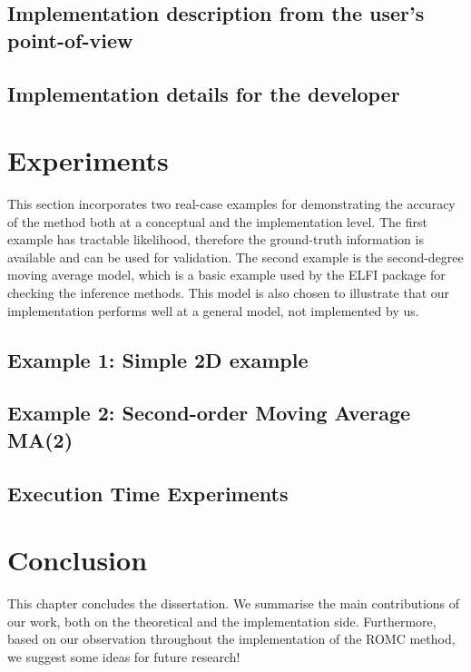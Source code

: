 \documentclass[11pt,twoside]{article}
\numberwithin{Theorem}{section}
\numberwithin{Definition}{section}
\numberwithin{Lemma}{section}
\numberwithin{Algorithm}{section}
\numberwithin{equation}{section}
\begin{document}
\subsection{Implementation description from the user's point-of-view}
\label{subsec:user}


\subsection{Implementation details for the developer}
\label{subsec:developers}

\clearpage


\section{Experiments}
This section incorporates two real-case examples for demonstrating the
accuracy of the method both at a conceptual and the implementation
level. The first example has tractable likelihood, therefore the
ground-truth information is available and can be used for
validation. The second example is the second-degree moving average
model, which is a basic example used by the ELFI package for checking
the inference methods. This model is also chosen to illustrate that
our implementation performs well at a general model, not implemented
by us.

\subsection{Example 1: Simple 2D example}
\label{subsec:ex1}


\subsection{Example 2: Second-order Moving Average MA(2)}
\label{subsec:ma2}


\subsection{Execution Time Experiments}
\label{subsec:exec}

\clearpage


\section{Conclusion}


This chapter concludes the dissertation. We summarise the main
contributions of our work, both on the theoretical and the
implementation side. Furthermore, based on our observation throughout
the implementation of the ROMC method, we suggest some ideas for
future research!
\end{document}
